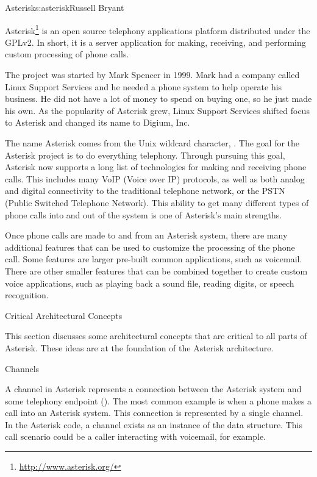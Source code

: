 \begin{aosachapter}{Asterisk}{s:asterisk}{Russell Bryant}

Asterisk\footnote{\url{http://www.asterisk.org/}} is an open source telephony
applications platform distributed under the GPLv2. In short, it is a
server application for making, receiving, and performing custom
processing of phone calls.

The project was started by Mark Spencer in 1999. Mark had a company
called Linux Support Services and he needed a phone system to help
operate his business. He did not have a lot of money to spend on
buying one, so he just made his own. As the popularity of Asterisk
grew, Linux Support Services shifted focus to Asterisk and changed
its name to Digium, Inc.

The name Asterisk comes from the Unix wildcard character,
\code{*}. The goal for the Asterisk project is to do everything
telephony. Through pursuing this goal, Asterisk now supports a long
list of technologies for making and receiving phone calls. This
includes many VoIP (Voice over IP) protocols, as well as both analog
and digital connectivity to the traditional telephone network, or the
PSTN (Public Switched Telephone Network). This ability to get many
different types of phone calls into and out of the system is one of
Asterisk's main strengths.

Once phone calls are made to and from an Asterisk system, there are
many additional features that can be used to customize the processing
of the phone call. Some features are larger pre-built common
applications, such as voicemail. There are other smaller features that
can be combined together to create custom voice applications, such as
playing back a sound file, reading digits, or speech recognition.

\begin{aosasect1}{Critical Architectural Concepts}

This section discusses some architectural concepts that are critical
to all parts of Asterisk. These ideas are at the foundation of
the Asterisk architecture.

\begin{aosasect2}{Channels}

A channel in Asterisk represents a connection between the Asterisk
system and some telephony endpoint
(). The most common example is
when a phone makes a call into an Asterisk system. This connection is
represented by a single channel. In the Asterisk code, a channel
exists as an instance of the  data structure.  This
call scenario could be a caller interacting with voicemail, for
example.


\end{aosasect2}
\end{aosasect1}
\end{aosachapter}
